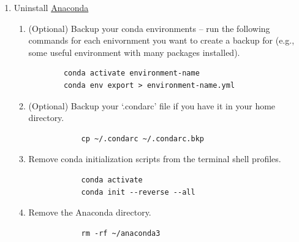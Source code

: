 \documentclass{article}
\begin{document}
\begin{enumerate}
    \item Uninstall \href{https://docs.anaconda.com/anaconda/install/uninstall/}{Anaconda}
    \begin{enumerate}
        \item  (Optional) Backup your conda environments -- run the following commands for each enivornment you want to create a backup for (e.g., some useful environment with many packages installed).
        \begin{verbatim}
        conda activate environment-name
        conda env export > environment-name.yml
        \end{verbatim}

        \item (Optional) Backup your `.condarc' file if you have it in your home directory.
        \begin{verbatim}
            cp ~/.condarc ~/.condarc.bkp
        \end{verbatim}
        \item Remove conda initialization scripts from the terminal shell profiles.

        \begin{verbatim}
            conda activate
            conda init --reverse --all
        \end{verbatim}

        \item Remove the Anaconda directory.
        \begin{verbatim}
            rm -rf ~/anaconda3
        \end{verbatim}


\end{enumerate}
\end{enumerate}
\end{document}
